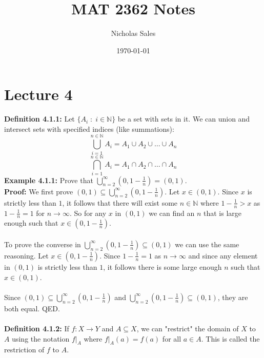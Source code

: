 \documentclass[11pt]{article}
\title{MAT 2362 Notes}
\author{Nicholas Sales}
\date{\today} %
\begin{document}
\maketitle

\tableofcontents
\newpage
    

\section{Lecture 4}
\textbf{Definition 4.1.1:} Let $\{A_{i}\;:\;i\in{\mathbb{N}}\}$ be a set with sets in it. We can union and intersect sets with specified indices (like summations):
\begin{equation*}
    \bigcup^{n\in{\mathbb{N}}}_{i=1}A_{i}=A_{1} \cup A_{2} \cup \dots \cup A_{n}
\end{equation*}
\begin{equation*} 
    \bigcap^{n\in{\mathbb{N}}}_{i=1}A_{i}=A_{1} \cap A_{2} \cap \dots \cap A_{n}
\end{equation*}
\textbf{Example 4.1.1:} Prove that $\bigcup_{n=2}^{\infty}(0,1-\frac{1}{n})=(0,1)$. \\
\textbf{Proof:} We first prove $(0,1) \subseteq \bigcup_{n=2}^{\infty}(0,1-\frac{1}{n})$. Let $x \in (0,1)$. Since $x$ is strictly less than $1$, it follows that there will exist some $n \in \mathbb{N}$ where $1-\frac{1}{n} > x$ as $1-\frac{1}{n}=1$ for $n \rightarrow \infty$. So for any $x$ in $(0,1)$ we can find an $n$ that is large enough such that $x \in (0,1-\frac{1}{n})$. \\
\vspace{0.1cm} \\
To prove the converse in $\bigcup_{n=2}^{\infty} (0,1-\frac{1}{n}) \subseteq (0,1)$ we can use the same reasoning. Let $x \in (0,1-\frac{1}{n})$. Since $1-\frac{1}{n}=1$ as $n \rightarrow \infty$ and since any element in $(0,1)$ is strictly less than $1$, it follows there is some large enough $n$ such that $x \in (0,1)$. \\
\vspace{0.1cm} \\
Since $(0,1) \subseteq \bigcup_{n=2}^{\infty}(0,1-\frac{1}{n})$ and $\bigcup_{n=2}^{\infty}(0,1-\frac{1}{n}) \subseteq (0,1)$, they are both equal. QED. \\
\vspace{0.1cm} \\
\textbf{Definition 4.1.2:} If $f : X \rightarrow Y$ and $A \subseteq X$, we can "restrict" the domain of $X$ to $A$ using the notation $f|_{A}$ where $f|_{A}(a)=f(a)$ for all $a \in A$. This is called the restriction of $f$ to $A$. \\
\end{document}
